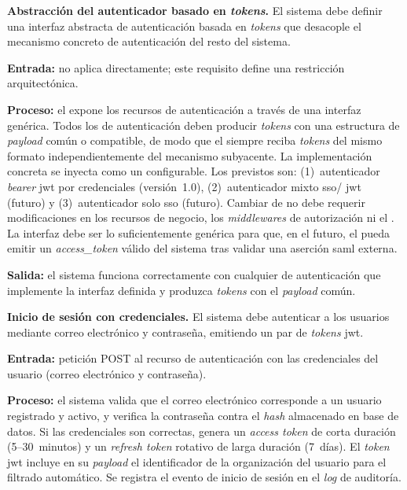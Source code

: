 \begin{functional}

    \item \textbf{Abstracción del autenticador basado en \textit{tokens}.}
    \label{rf:auth:abstraction}
    El sistema debe definir una interfaz abstracta de autenticación basada en \textit{tokens}
    que desacople el mecanismo concreto de autenticación del resto del sistema.

    \textbf{Entrada:} no aplica directamente; este requisito define una restricción
    arquitectónica.

    \textbf{Proceso:} el  expone los recursos de autenticación a través
    de una interfaz genérica. Todos los  de autenticación deben producir
    \textit{tokens} con una estructura de \textit{payload} común o compatible, de modo
    que el  siempre reciba \textit{tokens} del mismo formato
    independientemente del mecanismo subyacente. La implementación concreta se inyecta
    como un  configurable. Los  previstos son: (1)~autenticador
    \textit{bearer} \acs{jwt} por credenciales (versión~1.0), (2)~autenticador mixto \acs{sso}/
    \acs{jwt} (futuro) y (3)~autenticador solo \acs{sso} (futuro). Cambiar de  no debe
    requerir modificaciones en los recursos de negocio, los \textit{middlewares} de
    autorización ni el . La interfaz debe ser lo suficientemente genérica
    para que, en el futuro, el  pueda emitir un \textit{access\_token} válido
    del sistema tras validar una aserción \acs{saml} externa.

    \textbf{Salida:} el sistema funciona correctamente con cualquier  de
    autenticación que implemente la interfaz definida y produzca \textit{tokens} con el
    \textit{payload} común.

    \item \textbf{Inicio de sesión con credenciales.} \label{rf:auth:login}
    El sistema debe autenticar a los usuarios mediante correo electrónico y contraseña,
    emitiendo un par de \textit{tokens} \acs{jwt}.

    \textbf{Entrada:} petición POST al recurso de autenticación con las credenciales del
    usuario (correo electrónico y contraseña).

    \textbf{Proceso:} el sistema valida que el correo electrónico corresponde a un usuario
    registrado y activo, y verifica la contraseña contra el \textit{hash} almacenado en
    base de datos. Si las credenciales son correctas, genera un \textit{access token} de
    corta duración (5--30~minutos) y un \textit{refresh token} rotativo de
    larga duración (7~días). El \textit{token} \acs{jwt} incluye en su \textit{payload} el
    identificador de la organización del usuario para el filtrado 
    automático. Se registra el evento de inicio de sesión en el \textit{log} de auditoría.


\end{functional}
